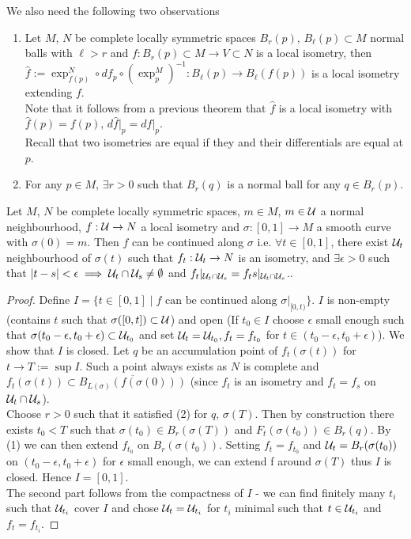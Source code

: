 \documentclass[10pt,a4paper]{article}
\begin{document}
We also need the following two observations
\begin{enumerate}
\item Let $M$, $N$ be complete locally symmetric spaces $B_r(p)$, $B_\ell(p)\subset M$ normal balls with $\ell>r$ and $f:B_r(p)\subset M\to V\subset N$ is a local isometry, then $\hat{f}:= \exp^N_{f(p)}\circ df_p\circ (\exp^M_p)^{-1}:B_\ell(p)\to B_\ell(f(p))$ is a local isometry extending $f$.\\
Note that it follows from a previous theorem that $\hat{f}$ is a local isometry with $\hat{f}(p)= f(p)$, $d\hat{f}\vert_p = df\vert_p$.\\
Recall that two isometries are equal if they and their differentials are equal at $p$.
\item For any $p\in M$, $\exists r>0$ such that $B_r(q)$ is a normal ball for any $q\in B_r(p)$.
\end{enumerate}

\begin{lemma}
Let $M$, $N$ be complete locally symmetric spaces, $m\in M$, $m\in\mathcal{U}$ a normal neighbourhood, $f:\mathcal{U}\to N$ a local isometry and $\sigma:[0,1]\to M$ a smooth curve with $\sigma(0)=m$. Then $f$ can be continued along $\sigma$ i.e. $\forall t\in [0,1]$, there exist $\mathcal{U}_t$ neighbourhood of $\sigma(t)$ such that $f_t:\mathcal{U}_t\to N$ is an isometry, and $\exists \epsilon>0$ such that $\vert t-s\vert <\epsilon\implies \mathcal{U}_t\cap \mathcal{U}_s\neq \emptyset$ and $f_t\vert_{\mathcal{U}_t\cap \mathcal{U}_s}=f_ts\vert_{\mathcal{U}_t\cap \mathcal{U}_s}$..
\end{lemma}
\begin{proof}
Define $I = \{t\in [0,1]\mid f \text{ can be continued along } \sigma\vert_{[0,t)}\}$. $I$ is non-empty (contains $t$ such that $\sigma([0,t])\subset \mathcal{U}$) and open (If $t_0\in I$ choose $\epsilon$ small enough such that $\sigma(t_0-\epsilon,t_0 + \epsilon)\subset \mathcal{U}_{t_0}$ and set $\mathcal{U}_t = \mathcal{U}_{t_0}, f_t = f_{t_0}$ for $t \in (t_0-\epsilon,t_0 + \epsilon)$). We show that $I$ is closed. Let $q$ be an accumulation point of $f_t(\sigma(t))$ for $t\to T:= \sup I$. Such a point always exists as $N$ is complete and $f_t(\sigma(t))\subset \overline{B_{L(\sigma)}(f(\sigma(0)))}$ (since $f_t$ is an isometry and $f_t = f_s$ on $\mathcal{U}_t\cap \mathcal{U}_s$).\\
Choose $r>0$ such that it satisfied (2) for $q$, $\sigma(T)$. Then by construction there exists $t_0<T$ such that $\sigma(t_0)\in B_r(\sigma(T))$ and $F_t(\sigma(t_0))\in B_r(q)$. By (1) we can then extend $f_{t_0}$ on $B_r(\sigma(t_0))$. Setting $f_t = f_{t_0}$ and $\mathcal{U}_t = B_r(\sigma(t_0))$ on $(t_0-\epsilon,t_0+\epsilon)$ for $\epsilon$ small enough, we can extend f around $\sigma(T)$ thus $I$ is closed. Hence $I = [0,1]$.\\
The second part follows from the compactness of $I$ - we can find finitely many $t_i$ such that $\mathcal{U}_{t_i}$ cover $I$ and chose $\mathcal{U}_t = \mathcal{U}_{t_i}$ for $t_i$ minimal such that $t\in \mathcal{U}_{t_i}$ and $f_t = f_{t_i}$.
\end{proof}
\end{document}
